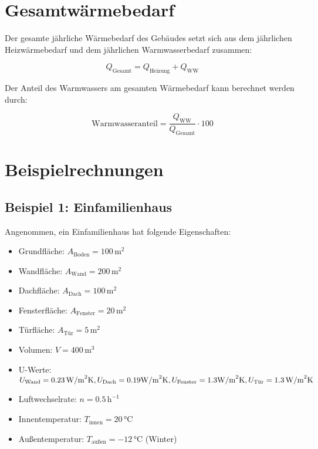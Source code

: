 \section{Gesamtwärmebedarf}

Der gesamte jährliche Wärmebedarf des Gebäudes setzt sich aus dem jährlichen Heizwärmebedarf und dem jährlichen Warmwasserbedarf zusammen:

\begin{equation}
Q_\text{Gesamt} = Q_\text{Heizung} + Q_\text{WW}
\end{equation}

Der Anteil des Warmwassers am gesamten Wärmebedarf kann berechnet werden durch:

\begin{equation}
\text{Warmwasseranteil} = \frac{Q_\text{WW}}{Q_\text{Gesamt}} \cdot 100
\end{equation}

\section{Beispielrechnungen}

\subsection{Beispiel 1: Einfamilienhaus}

Angenommen, ein Einfamilienhaus hat folgende Eigenschaften:
\begin{itemize}
    \item Grundfläche: \(A_\text{Boden} = 100 \, \text{m}^2\)
    \item Wandfläche: \(A_\text{Wand} = 200 \, \text{m}^2\)
    \item Dachfläche: \(A_\text{Dach} = 100 \, \text{m}^2\)
    \item Fensterfläche: \(A_\text{Fenster} = 20 \, \text{m}^2\)
    \item Türfläche: \(A_\text{Tür} = 5 \, \text{m}^2\)
    \item Volumen: \(V = 400 \, \text{m}^3\)
    \item U-Werte: 
    {\small \( U_\text{Wand} = 0.23 \, \text{W/m}^2\text{K}, U_\text{Dach} = 0.19 \, \\
            \text{W/m}^2\text{K}, U_\text{Fenster} = 1.3 \, \\
            \text{W/m}^2\text{K}, U_\text{Tür} = 1.3 \, \text{W/m}^2\text{K} \)}
    \item Luftwechselrate: \(n = 0.5 \, \text{h}^{-1}\)
    \item Innentemperatur: \(T_\text{innen} = 20 \, \text{°C}\)
    \item Außentemperatur: \(T_\text{außen} = -12 \, \text{°C}\) (Winter)
\end{itemize}

